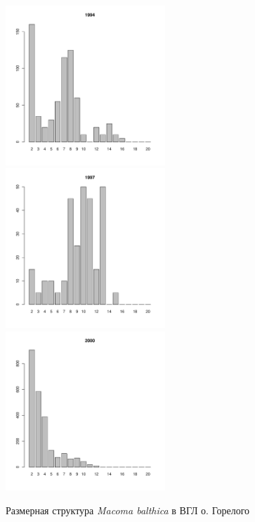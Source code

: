 \documentclass[12pt, a4paper]{article}
\begin{document}
\begin{figure}[h]
\begin{multicols}{3}
\hfill
\includegraphics[width=60mm]{../White_Sea/Luvenga_Goreliy/high2_1994_.pdf}
\hfill
\includegraphics[width=60mm]{../White_Sea/Luvenga_Goreliy/high2_1997_.pdf}
\hfill
\includegraphics[width=60mm]{../White_Sea/Luvenga_Goreliy/high2_2000_.pdf}
\end{multicols}



\caption{Размерная структура {\it Macoma balthica} в ВГЛ о. Горелого}
\label{ris:size_str_Goreliy_high}
\end{figure}
\end{document}
